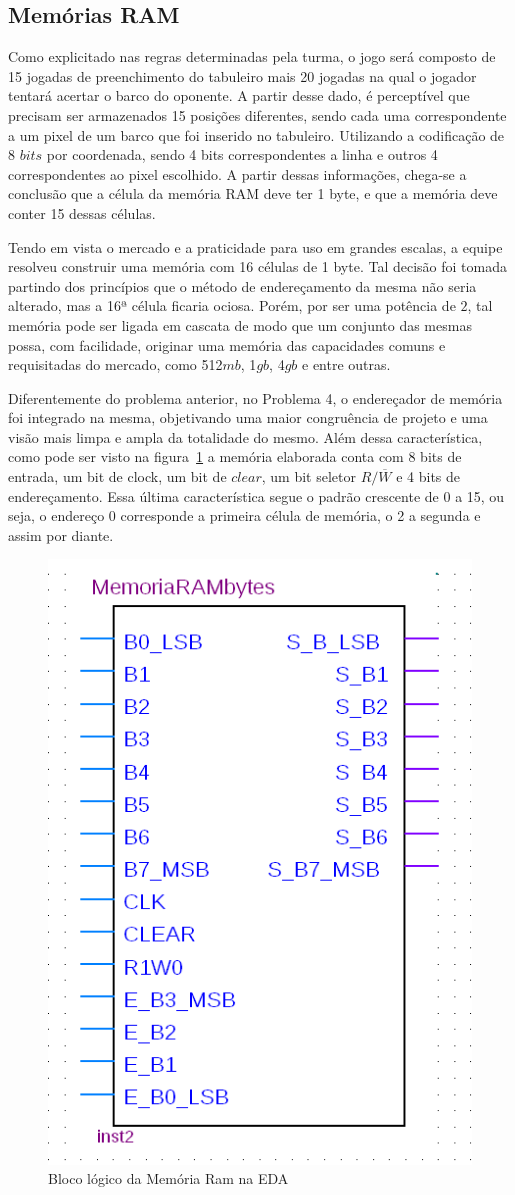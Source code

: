\documentclass[12pt]{article}
\begin{document}
\subsection{Memórias RAM}

Como explicitado nas regras determinadas pela turma, o jogo será composto de 15 jogadas de preenchimento do tabuleiro mais 20 jogadas na qual o jogador tentará acertar o barco do oponente. A partir desse dado, é perceptível que precisam ser armazenados 15 posições diferentes, sendo cada uma correspondente a um pixel de um barco que foi inserido no tabuleiro. Utilizando a codificação de 8 $bits$ por coordenada, sendo 4 bits correspondentes a linha e outros 4 correspondentes ao pixel escolhido. A partir dessas informações, chega-se a conclusão que a célula da memória RAM deve ter 1 byte, e que a memória deve conter 15 dessas células.

Tendo em vista o mercado e a praticidade para uso em grandes escalas, a equipe resolveu construir uma memória com 16 células de 1 byte. Tal decisão foi tomada partindo dos princípios que o método de endereçamento da mesma não seria alterado, mas a 16ª célula ficaria ociosa. Porém, por ser uma potência de $2$, tal memória pode ser ligada em cascata de modo que um conjunto das mesmas possa, com facilidade, originar uma memória das capacidades comuns e requisitadas do mercado, como 512$mb$, 1$gb$, 4$gb$ e entre outras.

Diferentemente do problema anterior, no Problema 4, o endereçador de memória foi integrado na mesma, objetivando uma maior congruência de projeto e uma visão mais limpa e ampla da totalidade do mesmo. Além dessa característica, como pode ser visto na figura~\ref{fig:ram15} a memória elaborada conta com 8 bits de entrada, um bit de clock, um bit de $clear$, um bit seletor $R/\overline{W}$ e 4 bits de endereçamento. Essa última característica segue o padrão crescente de 0 a 15, ou seja, o endereço 0 corresponde a primeira célula de memória, o 2 a segunda e assim por diante.


\begin{figure}[!htbp]
\centering
\includegraphics[width=.3\textwidth]{img/p4/ram15bytes.png}
\caption{Bloco lógico da Memória Ram na EDA}
\label{fig:ram15}
\end{figure}
\end{document}
